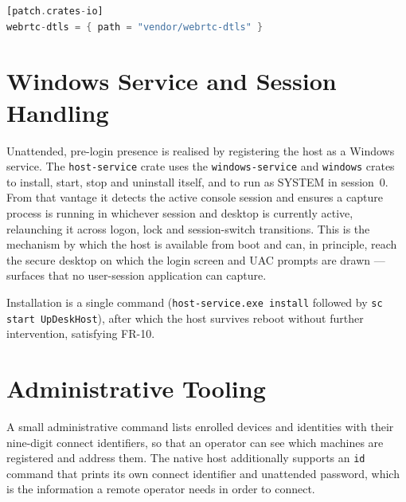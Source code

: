 \begin{lstlisting}[language=Rust,caption={Workspace patch redirecting webrtc-dtls to the fixed local copy.}]
[patch.crates-io]
webrtc-dtls = { path = "vendor/webrtc-dtls" }
\end{lstlisting}

\section{Windows Service and Session Handling}

Unattended, pre-login presence is realised by registering the host as a Windows
service. The \texttt{host-service} crate uses the \texttt{windows-service} and
\texttt{windows} crates to install, start, stop and uninstall itself, and to run
as SYSTEM in session~0. From that vantage it detects the active console session
and ensures a capture process is running in whichever session and desktop is
currently active, relaunching it across logon, lock and session-switch
transitions. This is the mechanism by which the host is available from boot and
can, in principle, reach the secure desktop on which the login screen and UAC
prompts are drawn --- surfaces that no user-session application can capture.

Installation is a single command (\texttt{host-service.exe install} followed by
\texttt{sc start UpDeskHost}), after which the host survives reboot without
further intervention, satisfying FR-10.

\section{Administrative Tooling}

A small administrative command lists enrolled devices and identities with their
nine-digit connect identifiers, so that an operator can see which machines are
registered and address them. The native host additionally supports an
\texttt{id} command that prints its own connect identifier and unattended
password, which is the information a remote operator needs in order to connect.

